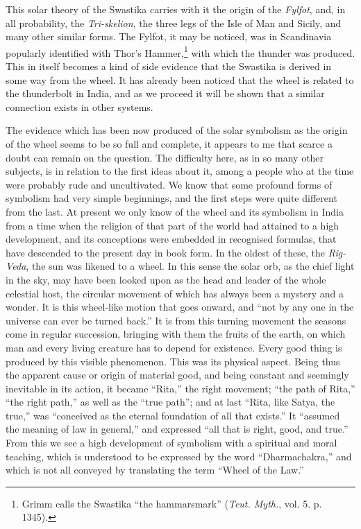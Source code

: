 \documentclass[a4paper, 11pt, oneside, polutonikogreek, english]{article}
\begin{document}
This solar theory of the Swastika carries with it the origin of the \emph{Fylfot}, and, in all probability, the \emph{Tri-skelion}, the three legs of the Isle of Man and Sicily, and many other similar forms. The Fylfot, it may be noticed, was in Scandinavia popularly identified with Thor's Hammer,\footnote{Grimm calls the Swastika ``the hammarsmark'' (\emph{Teut. Myth.}, vol. 5. p. 1345).} with which the thunder was produced. This in itself becomes a kind of side evidence that the Swastika is derived in some way from the wheel. It has already been noticed that the wheel is related to the thunderbolt in India, and as we proceed it will be shown that a similar connection exists in other systems.

The evidence which has been now produced of the solar symbolism as the origin of the wheel seems to be so full and complete, it appears to me that scarce a doubt can remain on the question. The difficulty here, as in so many other subjects, is in relation to the first ideas about it, among a people who at the time were probably rude and uncultivated. We know that some profound forms of symbolism had very simple beginnings, and the first steps were quite different from the last. At present we only know of the wheel and its symbolism in India from a time when the religion of that part of the world had attained to a high development, and its conceptions were embedded in recognised formulas, that have descended to the present day in book form. In the oldest of these, the \emph{Rig-Veda}, the sun was likened to a wheel. In this sense the solar orb, as the chief light in the sky, may have been looked upon as the head and leader of the whole celestial host, the circular movement of which has always been a mystery and a wonder. It is this wheel-like motion that goes onward, and ``not by any one in the universe can ever be turned back.'' It is from this turning movement the seasons come in regular succession, bringing with them the fruits of the earth, on which man and every living creature has to depend for existence. Every good thing is produced by this visible phenomenon. This was its physical aspect. Being thus the apparent cause or origin of material good, and being constant and seemingly inevitable in its action, it became ``Rita,'' the right movement; ``the path of Rita,'' ``the right path,'' as well as the ``true path''; and at last ``Rita, like Satya, the true,'' was ``conceived as the eternal foundation of all that exists.'' It ``assumed the meaning of law in general,'' and expressed ``all that is right, good, and true.'' From this we see a high development of symbolism with a spiritual and moral teaching, which is understood to be expressed by the word ``Dharmachakra,'' and which is not all conveyed by translating the term ``Wheel of the Law.''
\clearpage
\end{document}
